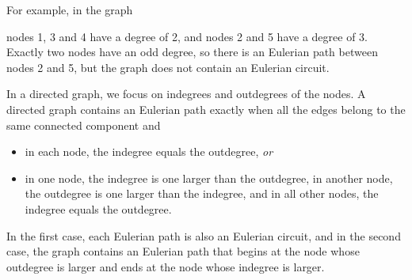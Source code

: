 \begin{samepage}
For example, in the graph
\begin{center}
\end{center}
\end{samepage}
nodes 1, 3 and 4 have a degree of 2,
and nodes 2 and 5 have a degree of 3.
Exactly two nodes have an odd degree,
so there is an Eulerian path between nodes 2 and 5,
but the graph does not contain an Eulerian circuit.

In a directed graph,
we focus on indegrees and outdegrees
of the nodes.
A directed graph contains an Eulerian path
exactly when all the edges belong to the same
connected component and
\begin{itemize}
\item in each node, the indegree equals the outdegree, \emph{or}
\item in one node, the indegree is one larger than the outdegree,
in another node, the outdegree is one larger than the indegree,
and in all other nodes, the indegree equals the outdegree.
\end{itemize}

In the first case, each Eulerian path
is also an Eulerian circuit,
and in the second case, the graph contains an Eulerian path
that begins at the node whose outdegree is larger
and ends at the node whose indegree is larger.

